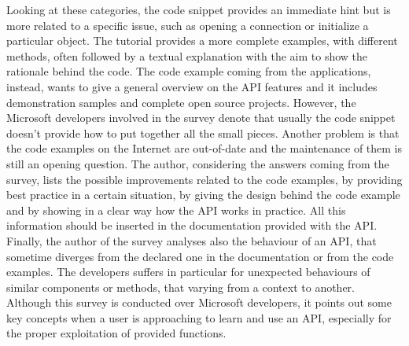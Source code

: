 Looking at these categories, the code snippet provides an immediate hint but is more related to a specific issue, such as opening a connection or initialize a particular object. The tutorial provides a more complete examples, with different methods, often followed by a textual explanation with the aim to show the rationale behind the code. The code example coming from the applications, instead, wants to give a general overview on the API features and it includes demonstration samples and complete open source projects. However, the Microsoft developers involved in the survey denote that usually the code snippet doesn't provide how to put together all the small pieces. Another problem is that the code examples on the Internet are out-of-date and the maintenance of them is still an opening question. The author, considering the answers coming from the survey, lists the possible improvements related to the code examples, by providing best practice in a certain situation, by giving the design behind the code example and by showing in a clear way how the API works in practice. All this information should be inserted in the documentation provided with the API. Finally, the author of the survey analyses also the behaviour of an API, that sometime diverges from the declared one in the documentation or from the code examples. The developers suffers in particular for unexpected behaviours of similar components or methods, that varying from a context to another. Although this survey is conducted over Microsoft developers, it points out some key concepts when a user is approaching to learn and use an API, especially for the proper exploitation of provided functions.  \newline
